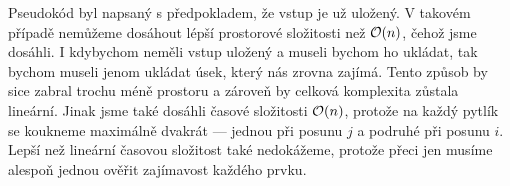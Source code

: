 \documentclass{../../../ksp-smallText}
\begin{document}
\begin{algorithm*}
    \caption{$largestLimitedSum(H, Z, M)$}
    \begin{algorithmic}
                \EndWhile{}
                \EndIf{}
            \EndWhile{}
    \end{algorithmic}
\end{algorithm*}

Pseudokód byl napsaný s předpokladem, že vstup je už uložený. V takovém případě nemůžeme dosáhout lépší
prostorové složitosti než $\mathcal{O}(n)$, čehož jsme dosáhli. I kdybychom neměli vstup uložený a museli bychom ho ukládat,
tak bychom museli jenom ukládat úsek, který nás zrovna zajímá. Tento způsob by sice zabral trochu méně prostoru a
zároveň by celková komplexita zůstala lineární. Jinak jsme také dosáhli časové složitosti $\mathcal{O}(n)$,
protože na každý pytlík se koukneme maximálně dvakrát --- jednou při posunu $j$ a podruhé při posunu $i$.
Lepší než lineární časovou složitost také nedokážeme, protože přeci jen musíme alespoň jednou ověřit zajímavost každého prvku.
\end{document}
